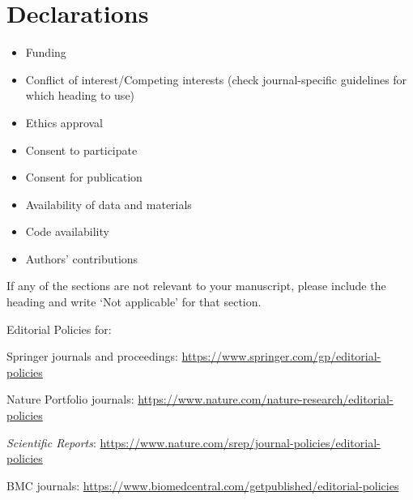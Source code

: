 \documentclass[default,iicol]{sn-jnl}%
\theoremstyle{thmstyleone}%
\theoremstyle{thmstyletwo}%
\theoremstyle{thmstylethree}%
\begin{document}
\section*{Declarations}


\begin{itemize}
\item Funding
\item Conflict of interest/Competing interests (check journal-specific guidelines for which heading to use)
\item Ethics approval 
\item Consent to participate
\item Consent for publication
\item Availability of data and materials
\item Code availability 
\item Authors' contributions
\end{itemize}

\noindent
If any of the sections are not relevant to your manuscript, please include the heading and write `Not applicable' for that section. 

\bigskip
\begin{flushleft}%
Editorial Policies for:

\bigskip\noindent
Springer journals and proceedings: \url{https://www.springer.com/gp/editorial-policies}

\bigskip\noindent
Nature Portfolio journals: \url{https://www.nature.com/nature-research/editorial-policies}

\bigskip\noindent
\textit{Scientific Reports}: \url{https://www.nature.com/srep/journal-policies/editorial-policies}

\bigskip\noindent
BMC journals: \url{https://www.biomedcentral.com/getpublished/editorial-policies}
\end{flushleft}
\end{document}
